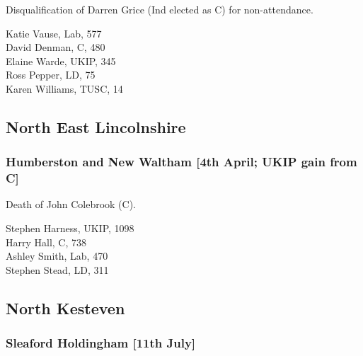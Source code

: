 \documentclass[a4paper,openany,10pt]{book}
\begin{document}

Disqualification of Darren Grice (Ind elected as C) for non-attendance.



Katie Vause, Lab, 577\\
David Denman, C, 480\\
Elaine Warde, UKIP, 345\\
Ross Pepper, LD, 75\\
Karen Williams, TUSC, 14\\


\subsection*{North East Lincolnshire}

\subsubsection*{Humberston and New Waltham \hspace*{\fill}\nolinebreak[1]%
\enspace\hspace*{\fill}
[4th April; UKIP gain from C]}


Death of John Colebrook (C).



Stephen Harness, UKIP, 1098\\
Harry Hall, C, 738\\
Ashley Smith, Lab, 470\\
Stephen Stead, LD, 311\\


\subsection*{North Kesteven}

\subsubsection*{Sleaford Holdingham \hspace*{\fill}\nolinebreak[1]%
\enspace\hspace*{\fill}
[11th July]}

\end{document}
